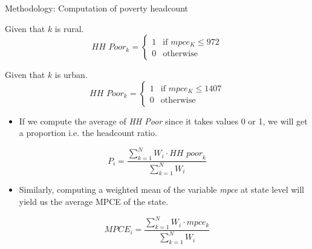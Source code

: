 \documentclass[10pt,aspectratio=169]{beamer}
\begin{document}
\begin{frame}{Methodology: Computation of poverty headcount}

    \begin{multicols}{2}
Given that $k$ is rural.
    \[
    \textit{HH Poor}_{k} =
    \begin{cases}
        1 & \text{if } mpce_{K} \leq 972 \\
        0 & \text{otherwise}
    \end{cases}
    \]

    \columnbreak
Given that $k$ is urban.
    \[
    \textit{HH Poor}_{k} =
    \begin{cases}
        1 & \text{if } mpce_{K} \leq 1407 \\
        0 & \text{otherwise}
    \end{cases}
    \]
\end{multicols}

\begin{itemize}
    \item If we compute the average of \textit{HH Poor} since it takes values 0 or 1, we will get a proportion i.e. the headcount ratio.
\end{itemize}
\begin{equation} \nonumber
    P_i = \frac{\sum_{k=1}^{N} W_i \cdot \textit{HH poor}_{k}}{\sum_{k=1}^{N} W_i }
\end{equation} 

\normalsize
\begin{itemize}
    \item  Similarly, computing a weighted mean of the variable \textit{mpce} at state level will yield us the average MPCE of the state.
    \end{itemize}

\begin{equation} \nonumber
    MPCE_i = \frac{\sum_{k=1}^{N} W_i \cdot mpce_{k}}{\sum_{k=1}^{N} W_i}
\end{equation}

\end{frame}
\end{document}
